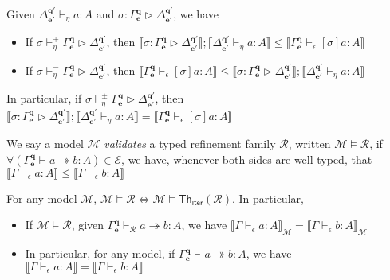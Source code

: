 \documentclass[acmsmall,screen,review]{acmart}
\newcommand{\mc}[1]{\ensuremath{\mathcal{#1}}}
\newcommand{\mb}[1]{\ensuremath{\mathbf{#1}}}
\newcommand{\ms}[1]{\ensuremath{\mathsf{#1}}}
\newcommand{\hasty}[4]{#1 \vdash_{#2} #3: {#4}}
\newcommand{\issubst}[3]{#1: #2 \rhd #3}
\newcommand{\csubst}[5]{#1 \vdash_{#4}^{#5} #2 \rhd #3}
\newcommand{\tref}{\twoheadrightarrow}
\newcommand{\tmle}[5]{#1 \vdash_{#2} #3 \tref #4 : {#5}}
\newcommand{\dnt}[1]{\llbracket{#1}\rrbracket}
\newcommand{\thsubiter}[1]{\ms{Th}_{\ms{iter}}(#1)}
\begin{document}
\begin{lemma}
  Given 
  $\hasty{\Delta^{\mb{q}'}_{\mb{e}'}}{\eta}{a}{A}$ and 
  $\issubst{\sigma}{\Gamma^{\mb{q}}_{\mb{e}}}{\Delta^{\mb{q}'}_{\mb{e}'}}$, we have
  \begin{itemize}
    \item If $\csubst{\sigma}{\Gamma^{\mb{q}}_{\mb{e}}}{\Delta^{\mb{q}'}_{\mb{e}'}}{\eta}{+}$, then
    $
    \dnt{\issubst{\sigma}{\Gamma^{\mb{q}}_{\mb{e}}}{\Delta^{\mb{q}'}_{\mb{e}'}}}
    ; \dnt{\hasty{\Delta^{\mb{q}'}_{\mb{e}'}}{\eta}{a}{A}}
    \leq \dnt{\hasty{\Gamma^{\mb{q}}_{\mb{e}}}{\epsilon}{[\sigma]a}{A}}
    $
    \item If $\csubst{\sigma}{\Gamma^{\mb{q}}_{\mb{e}}}{\Delta^{\mb{q}'}_{\mb{e}'}}{\eta}{-}$, then
    $
    \dnt{\hasty{\Gamma^{\mb{q}}_{\mb{e}}}{\epsilon}{[\sigma]a}{A}}
    \leq \dnt{\issubst{\sigma}{\Gamma^{\mb{q}}_{\mb{e}}}{\Delta^{\mb{q}'}_{\mb{e}'}}}
    ; \dnt{\hasty{\Delta^{\mb{q}'}_{\mb{e}'}}{\eta}{a}{A}}
    $
  \end{itemize}
  In particular, if 
  $\csubst{\sigma}{\Gamma^{\mb{q}}_{\mb{e}}}{\Delta^{\mb{q}'}_{\mb{e}'}}{\eta}{\pm}$, then
  $
  \dnt{\issubst{\sigma}{\Gamma^{\mb{q}}_{\mb{e}}}{\Delta^{\mb{q}'}_{\mb{e}'}}}
  ; \dnt{\hasty{\Delta^{\mb{q}'}_{\mb{e}'}}{\eta}{a}{A}}
  = \dnt{\hasty{\Gamma^{\mb{q}}_{\mb{e}}}{\epsilon}{[\sigma]a}{A}}
  $
\end{lemma}

\begin{definition}
  We say a model $\mc{M}$ \emph{validates} a typed refinement family $\mc{R}$, written $\mc{M}
  \models \mc{R}$, if
  $
  \forall (\tmle{\Gamma^{\mb{q}}_{\mb{e}}}{}{a}{b}{A}) \in \mc{E}
  $, we have, whenever both sides are well-typed, that
  $
  \dnt{\hasty{\Gamma}{\epsilon}{a}{A}} \leq \dnt{\hasty{\Gamma}{\epsilon}{b}{A}}
  $
\end{definition}

\begin{theorem}[name=Soundness, restate=soundnessiter]
  For any model $\mc{M}$, $\mc{M} \models \mc{R} \iff \mc{M} \models \thsubiter{\mc{R}}$. In
  particular,
  \begin{itemize}
    \item If $\mc{M} \models \mc{R}$, given $\tmle{\Gamma^{\mb{q}}_{\mb{e}}}{\mc{R}}{a}{b}{A}$, we
    have $\dnt{\hasty{\Gamma}{\epsilon}{a}{A}}_{\mc{M}} =
    \dnt{\hasty{\Gamma}{\epsilon}{b}{A}}_{\mc{M}}$
    \item In particular, for any model, if $\tmle{\Gamma^{\mb{q}}_{\mb{e}}}{}{a}{b}{A}$, we have
    $\dnt{\hasty{\Gamma}{\epsilon}{a}{A}} = \dnt{\hasty{\Gamma}{\epsilon}{b}{A}}$
  \end{itemize}
\end{theorem}
\end{document}

